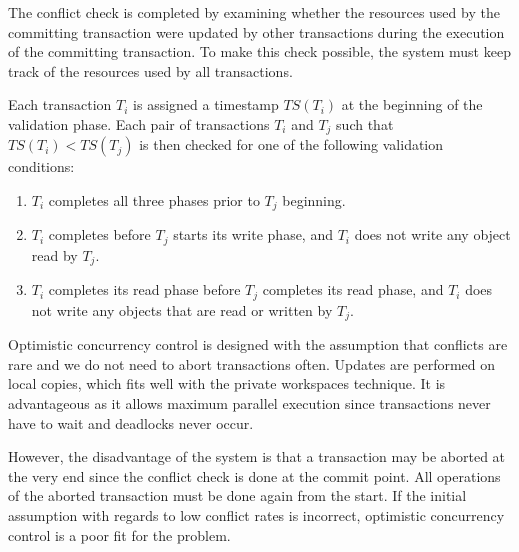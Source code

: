 The conflict check is completed by examining whether the resources used by the committing transaction were updated by other transactions during the execution of the committing transaction. To make this check possible, the system must keep track of the resources used by all transactions.

Each transaction $T_i$ is assigned a timestamp $TS(T_i)$ at the beginning of the validation phase. Each pair of transactions $T_i$ and $T_j$ such that $TS(T_i) < TS(T_j)$ is then checked for one of the following validation conditions: \begin{enumerate}
\item $T_i$ completes all three phases prior to $T_j$ beginning.
\item $T_i$ completes before $T_j$ starts its write phase, and $T_i$ does not write any object read by $T_j$.
\item $T_i$ completes its read phase before $T_j$ completes its read phase, and $T_i$ does not write any objects that are read or written by $T_j$.
\end{enumerate}

Optimistic concurrency control is designed with the assumption that conflicts are rare and we do not need to abort transactions often. Updates are performed on local copies, which fits well with the private workspaces technique. It is advantageous as it allows maximum parallel execution since transactions never have to wait and deadlocks never occur. 

However, the disadvantage of the system is that a transaction may be aborted at the very end since the conflict check is done at the commit point. All operations of the aborted transaction must be done again from the start. If the initial assumption with regards to low conflict rates is incorrect, optimistic concurrency control is a poor fit for the problem.